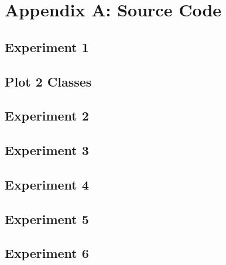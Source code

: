 \newpage
\flushleft
\appendix
\section{Appendix A: Source Code}
\label{App:AppendixA}

\subsection{Experiment 1}
	\label{code:1}

\subsection{Plot 2 Classes}
	\label{code:plot}

\subsection{Experiment 2}
	\label{code:2}
	

\subsection{Experiment 3}
	\label{code:3}

\subsection{Experiment 4}
	\label{code:4}


\subsection{Experiment 5}
	\label{code:5}


\subsection{Experiment 6}
	\label{code:6}
